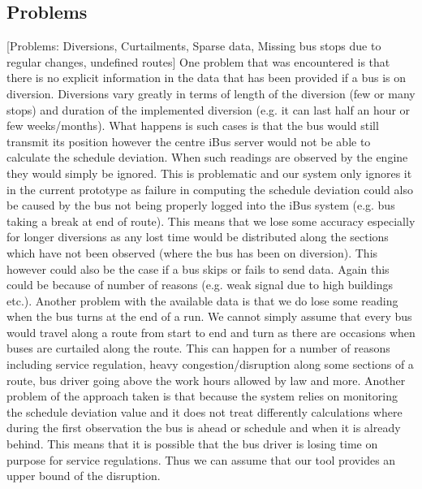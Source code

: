 \subsection{Problems}
[Problems: Diversions, Curtailments, Sparse data, Missing bus stops due to regular changes, undefined routes]
One problem that was encountered is that there is no explicit information in the data that has been provided if a bus is on diversion. Diversions vary greatly in terms of length of the diversion (few or many stops) and duration of the implemented diversion (e.g. it can last half an hour or few weeks/months). What happens is such cases is that the bus would still transmit its position however the centre iBus server would not be able to calculate the schedule deviation. When such readings are observed by the engine they would simply be ignored. This is problematic and our system only ignores it in the current prototype as failure in computing the schedule deviation could also be caused by the bus not being properly logged into the iBus system (e.g. bus taking a break at end of route). This means that we lose some accuracy especially for longer diversions as any lost time would be distributed along the sections which have not been observed (where the bus has been on diversion). This however could also be the case if a bus skips or fails to send data. Again this could be because of number of reasons (e.g. weak signal due to high buildings etc.).
Another problem with the available data is that we do lose some reading when the bus turns at the end of a run. We cannot simply assume that every bus would travel along a route from start to end and turn as there are occasions when buses are curtailed along the route. This can happen for a number of reasons including service regulation, heavy congestion/disruption along some sections of a route, bus driver going above the work hours allowed by law and more.
Another problem of the approach taken is that because the system relies on monitoring the schedule deviation value and it does not treat differently calculations where during the first observation the bus is ahead or schedule and when it is already behind. This means that it is possible that the bus driver is losing time on purpose for service regulations. Thus we can assume that our tool provides an upper bound of the disruption.

